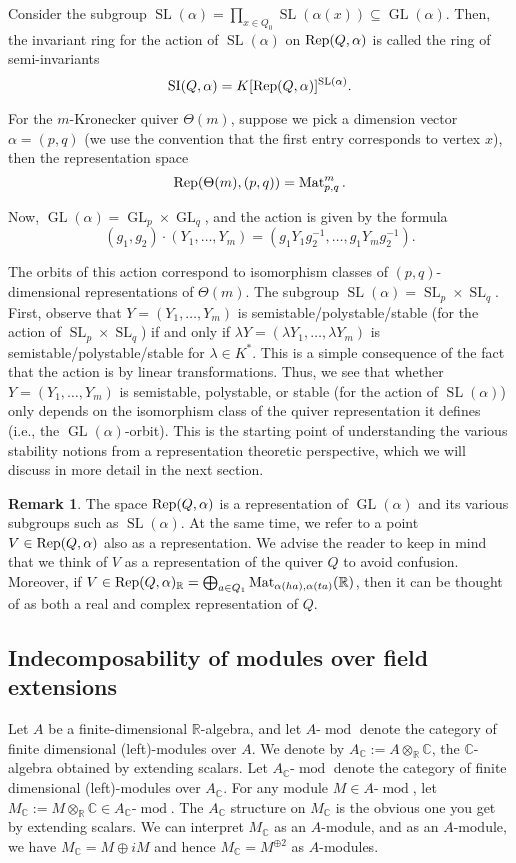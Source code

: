 \documentclass[11pt]{amsart}
\theoremstyle{definition}
\newtheorem{remark}[theorem]{Remark}
\newcommand{\R}{{\mathbb R}}
\newcommand{\Rep}{{\rm Rep}}
\newcommand{\SI}{{\rm SI}}
\newcommand{\C}{{\mathbb C}}
\newcommand{\Mat}{\operatorname{Mat}}
\newcommand{\GL}{\operatorname{GL}}
\newcommand{\SL}{\operatorname{SL}}
\newcommand{\Mod}{\operatorname{mod}}
\begin{document}
Consider the subgroup $\SL(\alpha) = \prod_{x \in Q_0} \SL(\alpha(x)) \subseteq \GL(\alpha)$. Then, the invariant ring for the action of $\SL(\alpha)$ on $\Rep(Q,\alpha)$ is called the ring of semi-invariants
$$
\SI(Q,\alpha) = K[\Rep(Q,\alpha)]^{\SL(\alpha)}.
$$

For the $m$-Kronecker quiver $\Theta(m)$, suppose we pick a dimension vector $\alpha = (p,q)$ (we use the convention that the first entry corresponds to vertex $x$), then the representation space 
$$
\Rep(\Theta(m),(p,q)) = \Mat_{p,q}^m.
$$

Now, $\GL(\alpha) = \GL_p \times \GL_q$, and the action is given by the formula 
$$
(g_1,g_2) \cdot (Y_1,\dots,Y_m) = (g_1 Y_1g_2^{-1},\dots, g_1 Y_m g_2^{-1}).
$$

The orbits of this action correspond to isomorphism classes of $(p,q)$-dimensional representations of $\Theta(m)$. The subgroup $\SL(\alpha) = \SL_p \times \SL_q$. First, observe that $Y = (Y_1,\dots,Y_m)$ is semistable/polystable/stable (for the action of $\SL_p \times \SL_q$) if and only if $\lambda Y = (\lambda Y_1,\dots, \lambda Y_m)$ is semistable/polystable/stable for $\lambda \in K^*$. This is a simple consequence of the fact that the action is by linear transformations. Thus, we see that whether $Y = (Y_1,\dots,Y_m)$ is semistable, polystable, or stable (for the action of $\SL(\alpha)$) only depends on the isomorphism class of the quiver representation it defines (i.e., the $\GL(\alpha)$-orbit). This is the starting point of understanding the various stability notions from a representation theoretic perspective, which we will discuss in more detail in the next section. 

\begin{remark}
The space $\Rep(Q,\alpha)$ is a representation of $\GL(\alpha)$ and its various subgroups such as $\SL(\alpha)$. At the same time, we refer to a point $V \in \Rep(Q,\alpha)$ also as a representation. We advise the reader to keep in mind that we think of $V$ as a representation of the quiver $Q$ to avoid confusion. Moreover, if $V \in \Rep(Q,\alpha)_\R = \bigoplus_{a \in Q_1} \Mat_{\alpha(ha),\alpha(ta)}(\R)$, then it can be thought of as both a real and complex representation of $Q$.
\end{remark}

\subsection{Indecomposability of modules over field extensions}
Let $A$ be a finite-dimensional $\R$-algebra, and let $A\text{-}\Mod$ denote the category of finite dimensional (left)-modules over $A$. We denote by $A_\C := A \otimes_\R \C$, the $\C$-algebra obtained by extending scalars. Let $A_\C\text{-}\Mod$ denote the category of finite dimensional (left)-modules over $A_\C$. For any module $M \in A\text{-}\Mod$, let $M_\C := M \otimes_\R \C \in A_\C\text{-}\Mod$. The $A_\C$ structure on $M_\C$ is the obvious one you get by extending scalars. We can interpret $M_\C$ as an $A$-module, and as an $A$-module, we have $M_\C = M \oplus i M$ and hence $M_\C = M^{\oplus 2}$ as $A$-modules.
\end{document}
